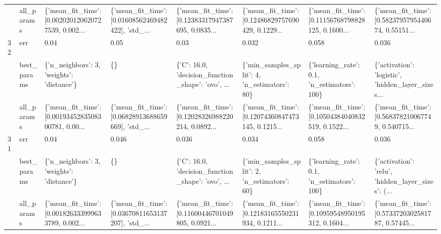 \begin{tabular}{llllllll}
   & all\_params &  \{'mean\_fit\_time': [0.002020120620727539, 0.002... &  \{'mean\_fit\_time': [0.01608562469482422], 'std\_... &  \{'mean\_fit\_time': [0.12383317947387695, 0.0835... &  \{'mean\_fit\_time': [0.12486829757690429, 0.1229... &  \{'mean\_fit\_time': [0.11156768798828125, 0.1600... &  \{'mean\_fit\_time': [0.5823795795440674, 0.55151... \\
32 & err &                                               0.04 &                                               0.05 &                                               0.03 &                                              0.032 &                                              0.058 &                                              0.036 \\
   & best\_params &          \{'n\_neighbors': 3, 'weights': 'distance'\} &                                                 \{\} &  \{'C': 16.0, 'decision\_function\_shape': 'ovo', ... &       \{'min\_samples\_split': 4, 'n\_estimators': 80\} &        \{'learning\_rate': 0.1, 'n\_estimators': 100\} &  \{'activation': 'logistic', 'hidden\_layer\_sizes... \\
   & all\_params &  \{'mean\_fit\_time': [0.0019345283508300781, 0.00... &  \{'mean\_fit\_time': [0.06828913688659669], 'std\_... &  \{'mean\_fit\_time': [0.12028326988220214, 0.0892... &  \{'mean\_fit\_time': [0.12074360847473145, 0.1215... &  \{'mean\_fit\_time': [0.10504384040832519, 0.1522... &  \{'mean\_fit\_time': [0.568378210067749, 0.540715... \\
31 & err &                                               0.04 &                                              0.046 &                                              0.036 &                                              0.034 &                                              0.058 &                                              0.036 \\
   & best\_params &          \{'n\_neighbors': 3, 'weights': 'distance'\} &                                                 \{\} &  \{'C': 16.0, 'decision\_function\_shape': 'ovo', ... &       \{'min\_samples\_split': 2, 'n\_estimators': 60\} &        \{'learning\_rate': 0.1, 'n\_estimators': 100\} &  \{'activation': 'relu', 'hidden\_layer\_sizes': (... \\
   & all\_params &  \{'mean\_fit\_time': [0.001826333999633789, 0.002... &  \{'mean\_fit\_time': [0.03670811653137207], 'std\_... &  \{'mean\_fit\_time': [0.11600446701049805, 0.0921... &  \{'mean\_fit\_time': [0.12183165550231934, 0.1211... &  \{'mean\_fit\_time': [0.10959548950195312, 0.1604... &  \{'mean\_fit\_time': [0.5733720302581787, 0.57445... \\
\bottomrule
\end{tabular}
